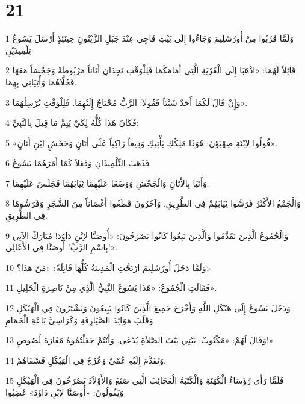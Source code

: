 \chapter{21}

\par 1 وَلَمَّا قَرُبُوا مِنْ أُورُشَلِيمَ وَجَاءُوا إِلَى بَيْتِ فَاجِي عِنْدَ جَبَلِ الزَّيْتُونِ حِينَئِذٍ أَرْسَلَ يَسُوعُ تِلْمِيذَيْنِ
\par 2 قَائِلاً لَهُمَا: «اذْهَبَا إِلَى الْقَرْيَةِ الَّتِي أَمَامَكُمَا فَلِلْوَقْتِ تَجِدَانِ أَتَاناً مَرْبُوطَةً وَجَحْشاً مَعَهَا فَحُلَّاهُمَا وَأْتِيَانِي بِهِمَا.
\par 3 وَإِنْ قَالَ لَكُمَا أَحَدٌ شَيْئاً فَقُولاَ: الرَّبُّ مُحْتَاجٌ إِلَيْهِمَا. فَلِلْوَقْتِ يُرْسِلُهُمَا».
\par 4 فَكَانَ هَذَا كُلُّهُ لِكَيْ يَتِمَّ مَا قِيلَ بِالنَّبِيِّ:
\par 5 «قُولُوا لاِبْنَةِ صِهْيَوْنَ: هُوَذَا مَلِكُكِ يَأْتِيكِ وَدِيعاً رَاكِباً عَلَى أَتَانٍ وَجَحْشٍ ابْنِ أَتَانٍ».
\par 6 فَذَهَبَ التِّلْمِيذَانِ وَفَعَلاَ كَمَا أَمَرَهُمَا يَسُوعُ
\par 7 وَأَتَيَا بِالأَتَانِ وَالْجَحْشِ وَوَضَعَا عَلَيْهِمَا ثِيَابَهُمَا فَجَلَسَ عَلَيْهِمَا.
\par 8 وَالْجَمْعُ الأَكْثَرُ فَرَشُوا ثِيَابَهُمْ فِي الطَّرِيقِ. وَآخَرُونَ قَطَعُوا أَغْصَاناً مِنَ الشَّجَرِ وَفَرَشُوهَا فِي الطَّرِيقِ.
\par 9 وَالْجُمُوعُ الَّذِينَ تَقَدَّمُوا وَالَّذِينَ تَبِعُوا كَانُوا يَصْرَخُونَ: «أُوصَنَّا لاِبْنِ دَاوُدَ! مُبَارَكٌ الآتِي بِاسْمِ الرَّبِّ! أُوصَنَّا فِي الأَعَالِي!».
\par 10 وَلَمَّا دَخَلَ أُورُشَلِيمَ ارْتَجَّتِ الْمَدِينَةُ كُلُّهَا قَائِلَةً: «مَنْ هَذَا؟»
\par 11 فَقَالَتِ الْجُمُوعُ: «هَذَا يَسُوعُ النَّبِيُّ الَّذِي مِنْ نَاصِرَةِ الْجَلِيلِ».
\par 12 وَدَخَلَ يَسُوعُ إِلَى هَيْكَلِ اللَّهِ وَأَخْرَجَ جَمِيعَ الَّذِينَ كَانُوا يَبِيعُونَ وَيَشْتَرُونَ فِي الْهَيْكَلِ وَقَلَبَ مَوَائِدَ الصَّيَارِفَةِ وَكَرَاسِيَّ بَاعَةِ الْحَمَامِ
\par 13 وَقَالَ لَهُمْ: «مَكْتُوبٌ: بَيْتِي بَيْتَ الصَّلاَةِ يُدْعَى. وَأَنْتُمْ جَعَلْتُمُوهُ مَغَارَةَ لُصُوصٍ!»
\par 14 وَتَقَدَّمَ إِلَيْهِ عُمْيٌ وَعُرْجٌ فِي الْهَيْكَلِ فَشَفَاهُمْ.
\par 15 فَلَمَّا رَأَى رُؤَسَاءُ الْكَهَنَةِ وَالْكَتَبَةُ الْعَجَائِبَ الَّتِي صَنَعَ وَالأَوْلاَدَ يَصْرَخُونَ فِي الْهَيْكَلِ وَيَقُولُونَ: «أُوصَنَّا لاِبْنِ دَاوُدَ» غَضِبُوا
